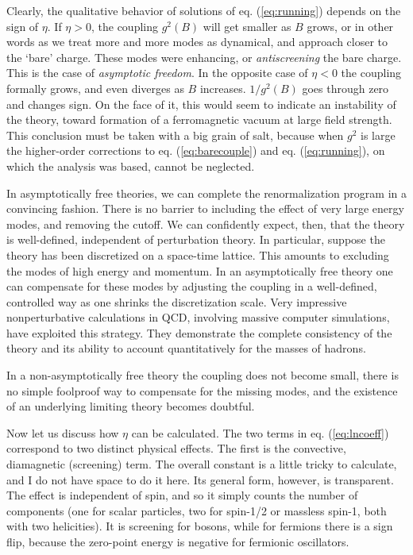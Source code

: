 \documentclass[12pt]{article}
\begin{document}
Clearly, the
qualitative behavior of solutions of eq. (\ref{eq:running}) depends on the
sign of $\eta$.  If $\eta > 0$, the coupling $g^2(B)$ will get smaller
as $B$ grows, or in other words as we treat more and more modes as
dynamical, and approach closer to the `bare' charge.  These modes
were enhancing, or {\it antiscreening\/} the bare charge.  This is the
case of {\it asymptotic freedom}.  In the opposite case of $\eta < 0$
the coupling formally grows, and even diverges as $B$
increases. $1/g^2(B)$ goes through zero and changes sign.  On the face of
it, this would seem to indicate an instability of the theory, toward
formation of a ferromagnetic vacuum at large field strength.  This
conclusion must be taken with a big grain of salt, because when $g^2$
is large the higher-order corrections to eq. (\ref{eq:barecouple}) and
eq. (\ref{eq:running}), on which the analysis was based, cannot be
neglected.  

In asymptotically free theories, we can complete the
renormalization program in a convincing fashion.  There is no barrier
to including the effect of very large energy modes, and removing the
cutoff.  We can confidently expect, then, that the theory is
well-defined, independent of perturbation theory.  In particular,
suppose the theory has been discretized on a space-time lattice.  This
amounts to excluding the modes of high energy and momentum.  In an
asymptotically free theory one can compensate for these modes by
adjusting the coupling in a well-defined, controlled way as one shrinks
the discretization scale.  Very impressive nonperturbative
calculations in QCD, involving massive computer simulations, have
exploited this strategy.  They demonstrate the complete consistency of
the theory and its ability to account quantitatively for the masses of
hadrons.

In a non-asymptotically free theory the coupling does not become
small, there is no simple foolproof way to compensate for the missing
modes, and the existence of an underlying limiting theory becomes
doubtful.

Now
let us discuss how $\eta$ can be calculated.  The two terms in
eq. (\ref{eq:lncoeff}) correspond to two distinct physical effects.  The
first is the convective, diamagnetic (screening) term.  The overall
constant is a little tricky to calculate, and I do not have space to
do it here.  Its general form, however, is transparent.  The effect is
independent of spin, and so it simply counts the number of components
(one for scalar particles, two for spin-1/2 or massless spin-1, both
with two helicities).  It is screening for bosons, while for fermions
there is a sign flip, because the zero-point energy is negative for
fermionic oscillators.  
\end{document}
